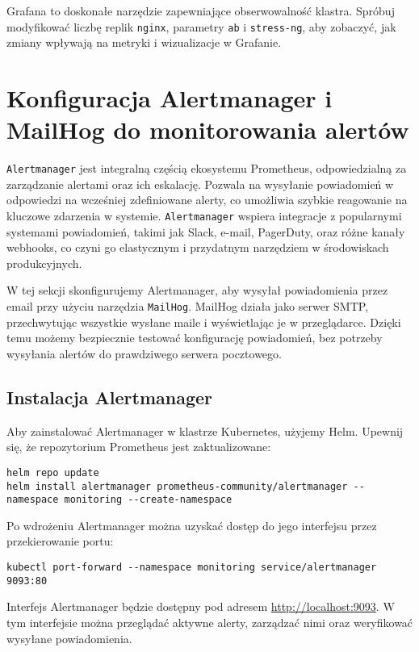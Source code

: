 \documentclass{article}
\begin{document}
Grafana to doskonałe narzędzie zapewniające obserwowalność klastra. Spróbuj modyfikować liczbę replik \texttt{nginx}, parametry \texttt{ab} i \texttt{stress-ng}, aby zobaczyć, jak zmiany wpływają na metryki i wizualizacje w Grafanie.

\section{Konfiguracja Alertmanager i MailHog do monitorowania alertów}

\texttt{Alertmanager} jest integralną częścią ekosystemu Prometheus, odpowiedzialną za zarządzanie alertami oraz ich eskalację. Pozwala na wysyłanie powiadomień w odpowiedzi na wcześniej zdefiniowane alerty, co umożliwia szybkie reagowanie na kluczowe zdarzenia w systemie. \texttt{Alertmanager} wspiera integracje z popularnymi systemami powiadomień, takimi jak Slack, e-mail, PagerDuty, oraz różne kanały webhooks, co czyni go elastycznym i przydatnym narzędziem w środowiskach produkcyjnych.

W tej sekcji skonfigurujemy Alertmanager, aby wysyłał powiadomienia przez email przy użyciu narzędzia \texttt{MailHog}. MailHog działa jako serwer SMTP, przechwytując wszystkie wysłane maile i wyświetlając je w przeglądarce. Dzięki temu możemy bezpiecznie testować konfigurację powiadomień, bez potrzeby wysyłania alertów do prawdziwego serwera pocztowego.

\subsection{Instalacja Alertmanager}

Aby zainstalować Alertmanager w klastrze Kubernetes, użyjemy Helm. Upewnij się, że repozytorium Prometheus jest zaktualizowane:

\begin{lstlisting}
helm repo update
helm install alertmanager prometheus-community/alertmanager --namespace monitoring --create-namespace
\end{lstlisting}

Po wdrożeniu Alertmanager można uzyskać dostęp do jego interfejsu przez przekierowanie portu:

\begin{lstlisting}
kubectl port-forward --namespace monitoring service/alertmanager 9093:80
\end{lstlisting}

Interfejs Alertmanager będzie dostępny pod adresem \url{http://localhost:9093}. W tym interfejsie można przeglądać aktywne alerty, zarządzać nimi oraz weryfikować wysyłane powiadomienia.
\end{document}
